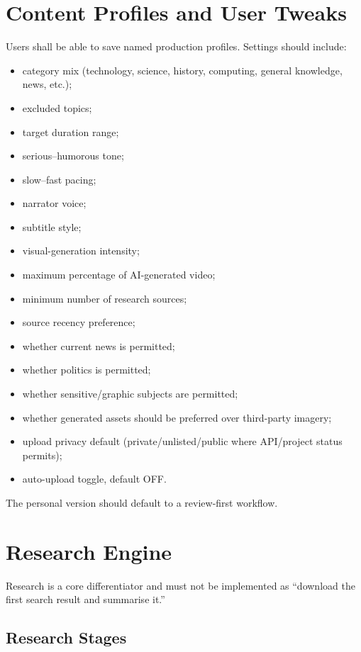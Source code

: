 \documentclass[10pt,journal,compsoc]{IEEEtran}
\begin{document}
\section{Content Profiles and User Tweaks}

Users shall be able to save named production profiles. Settings should include:
\begin{itemize}
    \item category mix (technology, science, history, computing, general knowledge, news, etc.);
    \item excluded topics;
    \item target duration range;
    \item serious--humorous tone;
    \item slow--fast pacing;
    \item narrator voice;
    \item subtitle style;
    \item visual-generation intensity;
    \item maximum percentage of AI-generated video;
    \item minimum number of research sources;
    \item source recency preference;
    \item whether current news is permitted;
    \item whether politics is permitted;
    \item whether sensitive/graphic subjects are permitted;
    \item whether generated assets should be preferred over third-party imagery;
    \item upload privacy default (private/unlisted/public where API/project status permits);
    \item auto-upload toggle, default OFF.
\end{itemize}

The personal version should default to a review-first workflow.

\section{Research Engine}

Research is a core differentiator and must not be implemented as ``download the first search result and summarise it.''

\subsection{Research Stages}
\end{document}
